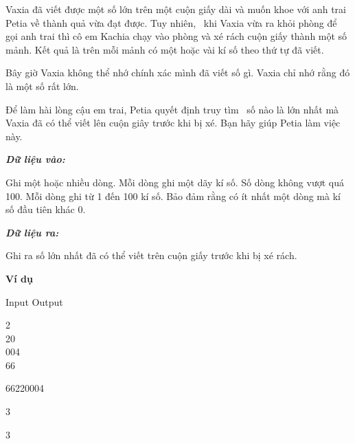 



   Vaxia đã viết được một số lớn trên một cuộn giấy dài và muốn khoe với anh trai Petia về thành quả vừa đạt được. Tuy nhiên,  khi Vaxia vừa ra khỏi phòng để gọi anh trai thì cô em Kachia chạy vào phòng và xé rách cuộn giấy thành một số mảnh. Kết quả là trên mỗi mảnh có một hoặc vài kí số theo thứ tự đã viết.  

   Bây giờ Vaxia không thể nhớ chính xác mình đã viết số gì. Vaxia chỉ nhớ rằng đó là một số rất lớn.  

   Để làm hài lòng cậu em trai, Petia quyết định truy tìm  số nào là lớn nhất mà Vaxia đã có thể viết lên cuộn giây trước khi bị xé. Bạn hãy giúp Petia làm việc này.  

\textbf{\emph{     Dữ liệu vào:    }}

   Ghi một hoặc nhiều dòng. Mỗi dòng ghi một dãy kí số. Số dòng không vượt quá 100. Mỗi dòng ghi từ 1 đến 100 kí số. Bảo đảm rằng có ít nhất một dòng mà kí số đầu tiên khác 0.  

\textbf{\emph{     Dữ liệu ra:    }}

   Ghi ra số lớn nhất đã có thể viết trên cuộn giấy trước khi bị xé rách.  

\textbf{    Ví dụ   }

       Input                      Output                        

       2       
\\       20       
\\       004       
\\       66      

       66220004      

       3      

       3      